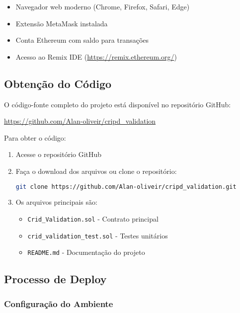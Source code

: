 \documentclass[12pt,a4paper]{article}
\begin{document}
\begin{itemize}
    \item Navegador web moderno (Chrome, Firefox, Safari, Edge)
    \item Extensão MetaMask instalada
    \item Conta Ethereum com saldo para transações
    \item Acesso ao Remix IDE (\url{https://remix.ethereum.org/})
\end{itemize}

\subsection{Obtenção do Código}

O código-fonte completo do projeto está disponível no repositório GitHub:

\begin{center}
\url{https://github.com/Alan-oliveir/cripd_validation}
\end{center}

Para obter o código:

\begin{enumerate}
    \item Acesse o repositório GitHub
    \item Faça o download dos arquivos ou clone o repositório:
    \begin{lstlisting}[language=bash, caption=Clonagem do Repositório]
git clone https://github.com/Alan-oliveir/cripd_validation.git
    \end{lstlisting}
    \item Os arquivos principais são:
    \begin{itemize}
        \item \texttt{Crid\_Validation.sol} - Contrato principal
        \item \texttt{crid\_validation\_test.sol} - Testes unitários
        \item \texttt{README.md} - Documentação do projeto
    \end{itemize}
\end{enumerate}

\subsection{Processo de Deploy}

\subsubsection{Configuração do Ambiente}
\end{document}
